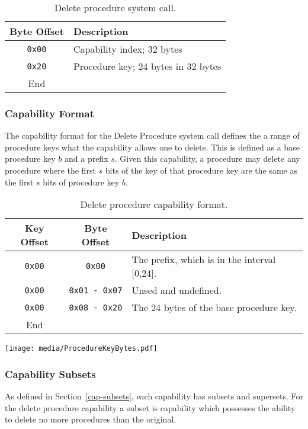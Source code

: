 \documentclass[english,a4paper]{article}
\let\oldparagraph\subsubsection
\renewcommand{\subsubsection}[1]{\oldparagraph{#1}\mbox{}}
\begin{document}
\begin{table}[H]
  \caption{Delete procedure system call.}
  \centering{}%
  \begin{tabularx}{\textwidth}{c|X}
    \hline
    Byte Offset & Description\\
    \hline
    \hline
    \texttt{0x00} & Capability index; 32 bytes \\
    \texttt{0x20} & Procedure key; 24 bytes in 32 bytes \\
    \hline
    End &  \\
    \hline
  \end{tabularx}
\end{table}

\subsubsection{Capability Format}
The capability format for the Delete Procedure system call defines the a range
of procedure keys what the capability allows one to delete. This is defined as a
base procedure key $b$ and a prefix $s$. Given this capability, a procedure may
delete any procedure where the first $s$ bits of the key of that procedure key are
the same as the first $s$ bits of procedure key $b$.

\begin{table}[H]
  \caption{Delete procedure capability format.}
  \centering{}%
  \begin{tabularx}{\textwidth}{c|c|X}
    \hline
    Key Offset & Byte Offset & Description \\
    \hline
    \hline
    \texttt{0x00} & \texttt{0x00} & The prefix, which is in the interval [0,24]. \\
    \texttt{0x00} & \texttt{0x01 - 0x07} & Unsed and undefined. \\
    \texttt{0x00} & \texttt{0x08 - 0x20} & The 24 bytes of the base procedure key. \\
    \hline
    End &   \\
    \hline
  \end{tabularx}
\end{table}

\texttt{[image: media/ProcedureKeyBytes.pdf]}

\subsubsection{Capability Subsets}
As defined in Section~\ref{cap-subsets}, each capability has subsets and
supersets. For the delete procedure capability a subset is capability which
possesses the ability to delete no more procedures than the original.
\end{document}
